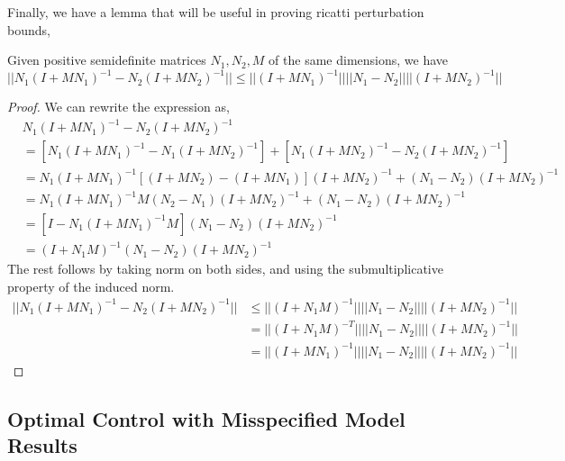 Finally, we have a lemma that will be useful in proving ricatti
perturbation bounds,
\begin{lemma}
  Given positive semidefinite matrices $N_{1}, N_{2}, M$ of the same dimensions,
  we have
  \begin{equation}
    \label{eq:90}
    ||N_{1}(I + MN_{1})^{-1} - N_{2}(I + MN_{2})^{-1}|| \leq ||(I + MN_{1})^{-1}|| ||N_{1} - N_{2}|| ||(I + MN_{2})^{-1}||
  \end{equation}
  \label{lemma:stackexchange}
\end{lemma}
\begin{proof}
  We can rewrite the expression as,
  \begin{align*}
    &N_1(I+MN_1)^{-1}-N_2(I+MN_2)^{-1}\\
    &=\left[N_1(I+MN_1)^{-1}-N_1(I+MN_2)^{-1}\right]
    +\left[N_1(I+MN_2)^{-1}-N_2(I+MN_2)^{-1}\right]\\
    &=N_1(I+MN_1)^{-1}\left[(I+MN_2)-(I+MN_1)\right](I+MN_2)^{-1}
    +(N_1-N_2)(I+MN_2)^{-1}\\
    &=N_1(I+MN_1)^{-1}M(N_2-N_1)(I+MN_2)^{-1}
    +(N_1-N_2)(I+MN_2)^{-1}\\
    &=\left[I-N_1(I+MN_1)^{-1}M\right](N_1-N_2)(I+MN_2)^{-1} \\
    &=(I + N_{1}M)^{{-1}}(N_1-N_2)(I+MN_2)^{-1}
  \end{align*}
  The rest follows by taking norm on both sides, and using the submultiplicative
  property of the induced norm.
  \begin{align*}
    ||N_{1}(I + MN_{1})^{-1} - N_{2}(I + MN_{2})^{-1}|| &\leq ||(I + N_{1}M)^{-1}|| ||N_{1} - N_{2}|| ||(I + MN_{2})^{-1}|| \\
                                                        &= ||(I + N_{1}M)^{-T}||||N_{1} - N_{2}|| ||(I + MN_{2})^{-1}|| \\
    &= ||(I + MN_{1})^{-1}||||N_{1} - N_{2}|| ||(I + MN_{2})^{-1}||
  \end{align*}
\end{proof}

\subsection{Optimal Control with Misspecified Model Results}
\label{sec:cert-equiv-contr-2}

